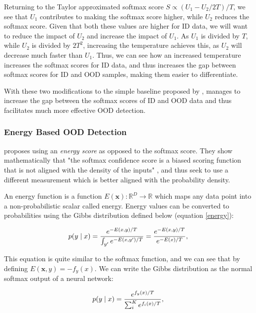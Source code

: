 \documentclass[conference]{IEEEtran}
\begin{document}
Returning to the Taylor approximated softmax score ${S\propto {(U_{1}-U_{2}/2T)/T}}$, we see that $U_1$ contributes to making the softmax score higher, while $U_2$ reduces the softmax score. Given that both these values are higher for ID data, we will want to reduce the impact of $U_2$ and increase the impact of $U_1$. As $U_1$ is divided by $T$, while $U_2$ is divided by $2T^2$, increasing the temperature achieves this, as $U_2$ will decrease much faster than $U_1$. Thus, we can see how an increased temperature increases the softmax scores for ID data, and thus increases the gap between softmax scores for ID and OOD samples, making them easier to differentiate.

With these two modifications to the simple baseline proposed by \cite{oodbaseline}, \cite{odin} manages to increase the gap between the softmax scores of ID and OOD data and thus facilitates much more effective OOD detection.
\\

\subsubsection{Energy Based OOD Detection}

\cite{energy} proposes using an {\it energy score} as opposed to the softmax score. They show mathematically that "the softmax confidence score is a biased scoring function that is not aligned with the density of the inputs" \cite{energy}, and thus seek to use a different measurement which is better aligned with the probability density.

An energy function is a function $E(\bm{x}) : \mathbb{R}^D \rightarrow \mathbb{R}$ which maps any data point into a non-probabilistic scalar called energy. Energy values can be converted to probabilities using the Gibbs distribution defined below (equation \ref{energy}):

\begin{equation} \label{energy}
    p(y \mid \*x) = \frac{e^{-E(\*x,y)/T}}{\int_{y'} e^{-E(\*x, y')/T}}
    = \frac{e^{-E(\*x,y)/T}}{e^{-E(\*x)/T}},
\end{equation}

This equation is quite similar to the softmax function, and we can see that by defining $E(\bm{x}, y) = -f_y(x)$. We can write the Gibbs distribution as the normal softmax output of a neural network:

\begin{equation}\label{eq:softmax}
    p(y \mid \*x) = \frac{e^{f_y(\*x)/T}}{\sum_{i}^K e^{f_{i}(\*x)/T}},
\end{equation}
\end{document}
